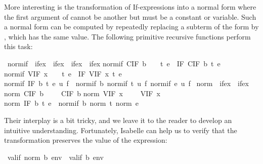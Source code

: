 \begin{isabelle}
\begin{isamarkuptext}
More interesting is the transformation of If-expressions into a normal form
where the first argument of  cannot be another  but
must be a constant or variable. Such a normal form can be computed by
repeatedly replacing a subterm of the form  by
, which has the same value. The following
primitive recursive functions perform this task:%
\end{isamarkuptext}%
\ normif\ {\isacharcolon}{\isacharcolon}\ {\isachardoublequote}ifex\ {\isasymRightarrow}\ ifex\ {\isasymRightarrow}\ ifex\ {\isasymRightarrow}\ ifex{\isachardoublequote}\isanewline
{}\isanewline
{\isachardoublequote}normif\ {\isacharparenleft}CIF\ b{\isacharparenright}\ \ \ \ t\ e\ {\isacharequal}\ IF\ {\isacharparenleft}CIF\ b{\isacharparenright}\ t\ e{\isachardoublequote}\isanewline
{\isachardoublequote}normif\ {\isacharparenleft}VIF\ x{\isacharparenright}\ \ \ \ t\ e\ {\isacharequal}\ IF\ {\isacharparenleft}VIF\ x{\isacharparenright}\ t\ e{\isachardoublequote}\isanewline
{\isachardoublequote}normif\ {\isacharparenleft}IF\ b\ t\ e{\isacharparenright}\ u\ f\ {\isacharequal}\ normif\ b\ {\isacharparenleft}normif\ t\ u\ f{\isacharparenright}\ {\isacharparenleft}normif\ e\ u\ f{\isacharparenright}{\isachardoublequote}\isanewline
\isanewline
{}\ norm\ {\isacharcolon}{\isacharcolon}\ {\isachardoublequote}ifex\ {\isasymRightarrow}\ ifex{\isachardoublequote}\isanewline
{}\isanewline
{\isachardoublequote}norm\ {\isacharparenleft}CIF\ b{\isacharparenright}\ \ \ \ {\isacharequal}\ CIF\ b{\isachardoublequote}\isanewline
{\isachardoublequote}norm\ {\isacharparenleft}VIF\ x{\isacharparenright}\ \ \ \ {\isacharequal}\ VIF\ x{\isachardoublequote}\isanewline
{\isachardoublequote}norm\ {\isacharparenleft}IF\ b\ t\ e{\isacharparenright}\ {\isacharequal}\ normif\ b\ {\isacharparenleft}norm\ t{\isacharparenright}\ {\isacharparenleft}norm\ e{\isacharparenright}{\isachardoublequote}%
\begin{isamarkuptext}%
\noindent
Their interplay is a bit tricky, and we leave it to the reader to develop an
intuitive understanding. Fortunately, Isabelle can help us to verify that the
transformation preserves the value of the expression:%
\end{isamarkuptext}%
\ {\isachardoublequote}valif\ {\isacharparenleft}norm\ b{\isacharparenright}\ env\ {\isacharequal}\ valif\ b\ env{\isachardoublequote}%

\end{isabelle}
